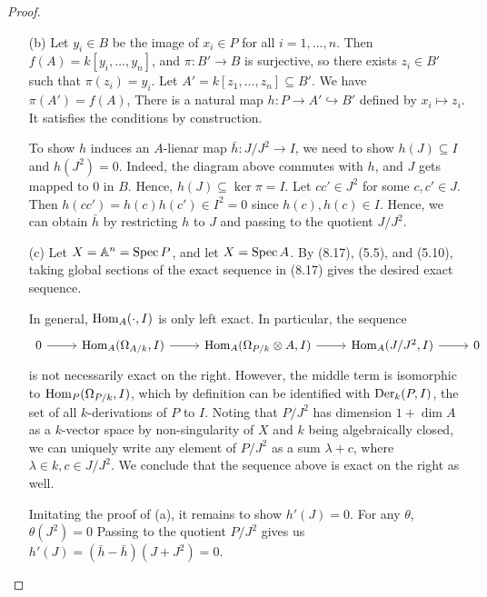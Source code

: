 \documentclass{article}
\begin{document}
\begin{enumerate} [label=\textbf{\arabic*.}, leftmargin=0em]
\begin{proof}
\begin{itemize} [leftmargin=0cm]
\item[(b)] Let $y_i \in B$ be the image of $x_i \in P$ for all $i = 1, \dots, n$. Then $f(A) = k[y_i, \dots, y_n]$, and $\pi : B' \to B$ is surjective, so there exists $z_i \in B'$ such that $\pi(z_i) = y_i$. Let $A' = k[z_1, \dots, z_n] \subseteq B'$. We have $\pi(A') = f(A)$, There is a natural map $h : P \to A' \hookrightarrow B'$ defined by $x_i \mapsto z_i$. It satisfies the conditions by construction.

To show $h$ induces an $A$-lienar map $\bar{h} : J/J^2 \to I$, we need to show $h(J) \subseteq I$ and $h(J^2) = 0$. Indeed, the diagram above commutes with $h$, and $J$ gets mapped to $0$ in $B$. Hence, $h(J) \subseteq \ker{\pi} = I$. Let $cc' \in J^2$ for some $c, c' \in J$. Then $h(cc') = h(c)h(c') \in I^2 = 0$ since $h(c), h(c) \in I$. Hence, we can obtain $\bar{h}$ by restricting $h$ to $J$ and passing to the quotient $J/J^2$.

\item[(c)] Let $X = \mathbb{A}^n = \operatorname{Spec}{P}$, and let $X = \operatorname{Spec}{A}$. By (8.17), (5.5), and (5.10), taking global sections of the exact sequence in (8.17) gives the desired exact sequence.

In general, $\operatorname{Hom}_A(\cdot, I)$ is only left exact. In particular, the sequence
\[ \begin{tikzcd}
    0 \arrow[r] & {\Hom_A(\Omega_{A/k},I)} \arrow[r] & {\Hom_A(\Omega_{P/k} \otimes A,I)} \arrow[r] & {\Hom_A(J/J^2,I)} \arrow[r] & 0
    \end{tikzcd} \]
is not necessarily exact on the right. However, the middle term is isomorphic to $\operatorname{Hom}_P(\Omega_{P/k}, I)$, which by definition can be identified with $\operatorname{Der}_k(P, I)$, the set of all $k$-derivations of $P$ to $I$. Noting that $P/J^2$ has dimension $1 + \dim{A}$ as a $k$-vector space by non-singularity of $X$ and $k$ being algebraically closed, we can uniquely write any element of $P/J^2$ as a sum $\lambda + c$, where $\lambda \in k, c \in J/J^2$. We conclude that the sequence above is exact on the right as well.

Imitating the proof of (a), it remains to show $h'(J) = 0$. For any $\theta$, $\theta(J^2) = 0$ Passing to the quotient $P/J^2$ gives us $h'(J) = (\bar{h} - \bar{h})(J + J^2) = 0$.
\end{itemize} 
\end{proof}

\end{enumerate}
\end{document}
